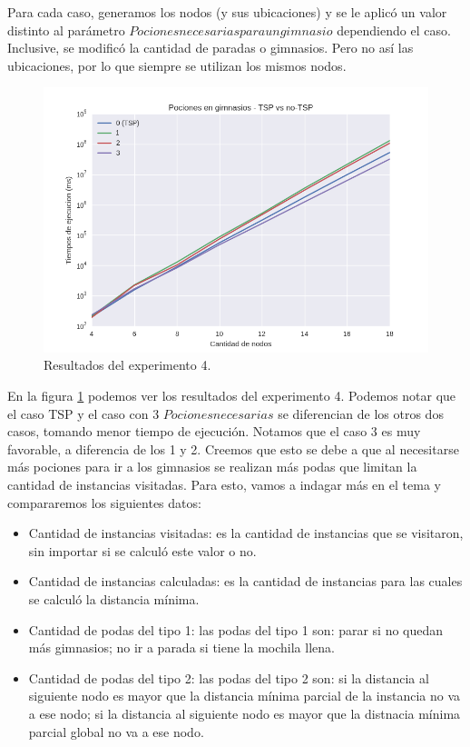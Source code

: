 \par Para cada caso, generamos los nodos (y sus ubicaciones) y se le aplicó un valor distinto al parámetro $Pociones necesarias para un gimnasio$ dependiendo el caso. Inclusive, se modificó la cantidad de paradas o gimnasios. Pero no así las ubicaciones, por lo que siempre se utilizan los mismos nodos.

\begin{figure}[H]
	\begin{center}
		\includegraphics[width=\textwidth]{img/ejercicio1/exp5_1.png}
		\caption{Resultados del experimento 4.}
		\label{fig: ej1_exp5_1}
	\end{center}
\end{figure}

\par En la figura \ref{fig: ej1_exp5_1} podemos ver los resultados del experimento 4. Podemos notar que el caso TSP y el caso con 3 $Pociones necesarias$ se diferencian de los otros dos casos, tomando menor tiempo de ejecución. Notamos que el caso 3 es muy favorable, a diferencia de los 1 y 2. Creemos que esto se debe a que al necesitarse más pociones para ir a los gimnasios se realizan más podas que limitan la cantidad de instancias visitadas. Para esto, vamos a indagar más en el tema y compararemos los siguientes datos:

\begin{itemize}
	\item Cantidad de instancias visitadas: es la cantidad de instancias que se visitaron, sin importar si se calculó este valor o no.
	\item Cantidad de instancias calculadas: es la cantidad de instancias para las cuales se calculó la distancia mínima.
	\item Cantidad de podas del tipo 1: las podas del tipo 1 son: parar si no quedan más gimnasios; no ir a parada si tiene la mochila llena.
	\item Cantidad de podas del tipo 2: las podas del tipo 2 son: si la distancia al siguiente nodo es mayor que la distancia mínima parcial de la instancia no va a ese nodo; si la distancia al siguiente nodo es mayor que la distnacia mínima parcial global no va a ese nodo.
\end{itemize}

